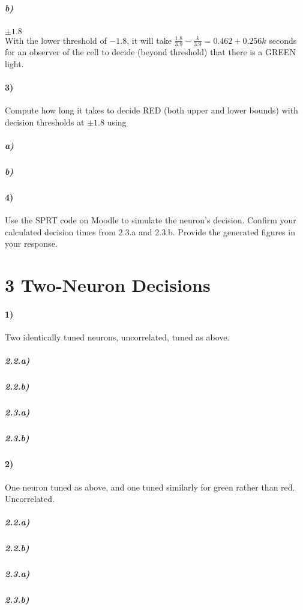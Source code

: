 \documentclass[10pt,letter]{article}
\begin{document}
\subparagraph{b)} $\pm 1.8$\\

With the lower threshold of $-1.8$, it will take $\frac{1.8}{3.9} - \frac{k}{3.9} = 
0.462 + 0.256 k$ seconds 
for an observer of the cell to decide (beyond threshold) that there is a GREEN light.\\

\paragraph{3)} Compute how long it takes to decide RED (both upper and lower bounds) with decision
thresholds at $\pm 1.8$ using

\subparagraph{a)} 

\subparagraph{b)} 

\paragraph{4)} Use the SPRT code on Moodle to simulate the neuron’s decision. Confirm your calculated
decision times from 2.3.a and 2.3.b. Provide the generated figures in your
response.

\section*{3 Two-Neuron Decisions}

\paragraph{1)} Two identically tuned neurons, uncorrelated, tuned as above.

\subparagraph{2.2.a)} 

\subparagraph{2.2.b)} 

\subparagraph{2.3.a)} 

\subparagraph{2.3.b)} 

\paragraph{2)} One neuron tuned as above, and one tuned similarly for green rather than 
    red. Uncorrelated.

\subparagraph{2.2.a)} 

\subparagraph{2.2.b)} 

\subparagraph{2.3.a)} 

\subparagraph{2.3.b)} 
\end{document}

